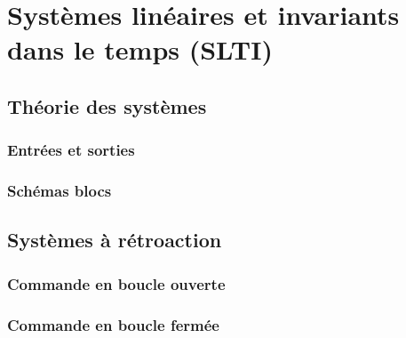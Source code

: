 \chapter{Systèmes linéaires et invariants dans le temps (SLTI)} \label{chap:systemes}
\section{Théorie des systèmes} \label{subsec:system_theory}
\subsection{Entrées et sorties} \label{subsec:inputs_outputs}
\subsection{Schémas blocs} \label{subsec:block_diagrams}
\section{Systèmes à rétroaction} \label{subsec:feedback}
\subsection{Commande en boucle ouverte} \label{subsec:open_loop}
\subsection{Commande en boucle fermée} \label{subsec:closed_loop}
